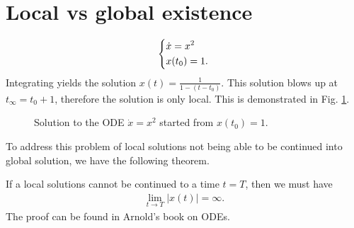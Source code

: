 \section{Local vs global existence}
\begin{ex}
	\begin{align}
		\begin{dcases}
			\dot{x} = x^2 \\
			x(t_0) = 1.
		\end{dcases}
	\end{align}
	Integrating yields the solution $x(t) = \frac{1}{1 - (t-t_0)}$. This solution blows up at $t_{\infty }=t_0 + 1$, therefore the solution is only local.	This is demonstrated in Fig. \ref{fig:chap1:5}.
\begin{figure}[H]
\centering	
{}
\caption{Solution to the ODE $\dot{x}=x^2$ started from $x(t_0)=1$.}
\label{fig:chap1:5}
\end{figure}
\end{ex}
To address this problem of local solutions not being able to be continued into global solution, we have the following theorem.
\begin{theorem}
	If a local solutions cannot be continued to a time $t=T$, then we must have
	\begin{align}
		\boxed{\lim_{t\to T} |x(t)|= \infty.}
	\end{align}
The proof can be found in Arnold's book on ODEs.
\end{theorem}


